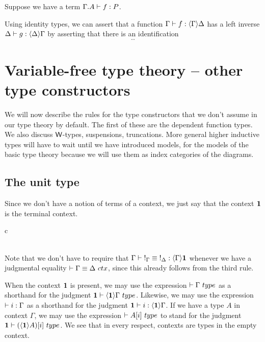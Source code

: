 Suppose we have a term $\jterm{\ctxext{\Gamma}{A}}{P}{f}$. 

Using identity types, we can assert that a function $\jhom{\Gamma}{\Delta}{f}$ has
a left inverse $\jhom{\Delta}{\Gamma}{g}$ by asserting that there is an identification
\begin{equation*}
..
\end{equation*}

\section{Variable-free type theory -- other type constructors}
We will now describe the rules for the type constructors that we don't assume
in our type theory by default. The first of these are the dependent function
types. We also discuss $\mathsf{W}$-types, suspensions, truncations. More general higher inductive
types will have to wait until we have introduced models, for the models of the
basic type theory because we will use them as index categories of the diagrams.

\subsection{The unit type}
Since we don't have a notion of terms of a context, we just say that the context
$\mathbf{1}$ is the terminal context.

\begin{infarray}{c}
\inference{}{\jctx{\unit}}\\
\inference{\jctx{\Gamma}}{\jhom{\Gamma}{\unit}{\tounit{\Gamma}}}\\
\end{infarray}

Note that we don't have to require that $\jhomeq{\Gamma}{\unit}{\tounit{\Gamma}}{\tounit{\Delta}}$
whenever we have a judgmental equality $\jctxeq{\Gamma}{\Delta}$, since this already follows from the third rule.

When the context $\mathbf{1}$ is present, we may use the expression $\jtype{}{\Gamma}$
as a shorthand for the judgment $\jtype{\unit}{\ctxwk{\unit}{\Gamma}}$. Likewise,
we may use the expression $\jtermc{\Gamma}{i}$ as a shorthand
for the judgment $\jhom{\unit}{\Gamma}{i}$. If we have a type $A$ in context
$\Gamma$, we may use the expression $\jtype{}{\subst{i}{A}}$ to stand for
the judgment $\jtype{\unit}{\subst{i}{\ctxwk{\unit}{A}}}$. We see that in every
respect, contexts are types in the empty context.

